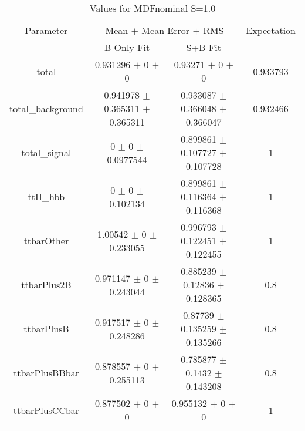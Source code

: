 \begin{table}
\centering
\caption{Values for MDFnominal S=1.0}
\begin{tabular}{cccc}
\toprule
Parameter & \multicolumn{2}{c}{Mean $\pm$ Mean Error $\pm$ RMS} & Expectation\\
 & B-Only Fit & S+B Fit & \\
\midrule
total & \num{0.931296} $\pm$ \num{0} $\pm$ \num{0} & \num{0.93271} $\pm$ \num{0} $\pm$ \num{0} & \num{0.933793}\\
total\_background & \num{0.941978} $\pm$ \num{0.365311} $\pm$ \num{0.365311} & \num{0.933087} $\pm$ \num{0.366048} $\pm$ \num{0.366047} & \num{0.932466}\\
total\_signal & \num{0} $\pm$ \num{0} $\pm$ \num{0.0977544} & \num{0.899861} $\pm$ \num{0.107727} $\pm$ \num{0.107728} & \num{1}\\
ttH\_hbb & \num{0} $\pm$ \num{0} $\pm$ \num{0.102134} & \num{0.899861} $\pm$ \num{0.116364} $\pm$ \num{0.116368} & \num{1}\\
ttbarOther & \num{1.00542} $\pm$ \num{0} $\pm$ \num{0.233055} & \num{0.996793} $\pm$ \num{0.122451} $\pm$ \num{0.122455} & \num{1}\\
ttbarPlus2B & \num{0.971147} $\pm$ \num{0} $\pm$ \num{0.243044} & \num{0.885239} $\pm$ \num{0.12836} $\pm$ \num{0.128365} & \num{0.8}\\
ttbarPlusB & \num{0.917517} $\pm$ \num{0} $\pm$ \num{0.248286} & \num{0.87739} $\pm$ \num{0.135259} $\pm$ \num{0.135266} & \num{0.8}\\
ttbarPlusBBbar & \num{0.878557} $\pm$ \num{0} $\pm$ \num{0.255113} & \num{0.785877} $\pm$ \num{0.1432} $\pm$ \num{0.143208} & \num{0.8}\\
ttbarPlusCCbar & \num{0.877502} $\pm$ \num{0} $\pm$ \num{0} & \num{0.955132} $\pm$ \num{0} $\pm$ \num{0} & \num{1}\\
\bottomrule
\end{tabular}
\end{table}